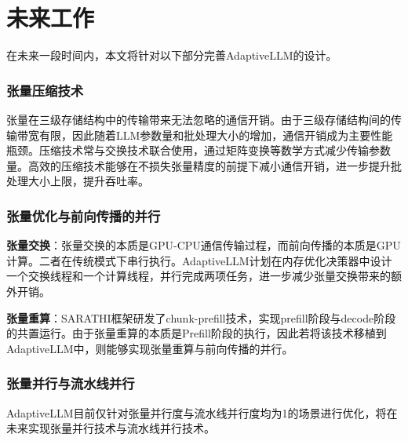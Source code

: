 \section{未来工作}

在未来一段时间内，本文将针对以下部分完善AdaptiveLLM的设计。 \par

\subsubsection{张量压缩技术}

张量在三级存储结构中的传输带来无法忽略的通信开销。由于三级存储结构间的传输带宽有限，因此随着LLM参数量和批处理大小的增加，通信开销成为主要性能瓶颈。压缩技术常与交换技术联合使用，通过矩阵变换等数学方式减少传输参数量。高效的压缩技术能够在不损失张量精度的前提下减小通信开销，进一步提升批处理大小上限，提升吞吐率。

\subsubsection{张量优化与前向传播的并行}

\textbf{张量交换}：张量交换的本质是GPU-CPU通信传输过程，而前向传播的本质是GPU计算。二者在传统模式下串行执行。AdaptiveLLM计划在内存优化决策器中设计一个交换线程和一个计算线程，并行完成两项任务，进一步减少张量交换带来的额外开销。 \par 

\textbf{张量重算}：SARATHI\cite{SARATHI}框架研发了chunk-prefill技术，实现prefill阶段与decode阶段的共置运行。由于张量重算的本质是Prefill阶段的执行，因此若将该技术移植到AdaptiveLLM中，则能够实现张量重算与前向传播的并行。

\subsubsection{张量并行与流水线并行\cite{Parallelism}} AdaptiveLLM目前仅针对张量并行度与流水线并行度均为1的场景进行优化，将在未来实现张量并行技术与流水线并行技术。